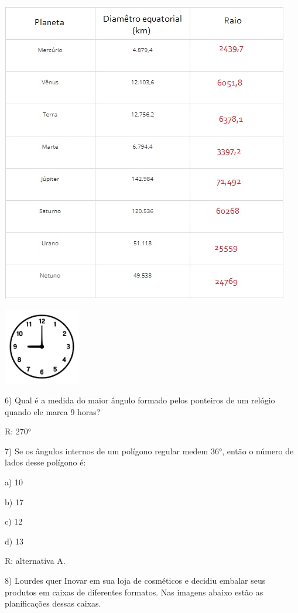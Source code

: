 \includegraphics[width=4.96875in,height=5.22917in]{./imgSAEB_6_MAT/media/image49.png}

\includegraphics[width=1.32083in,height=1.32083in]{./imgSAEB_6_MAT/media/image50.jpeg}

6) Qual é a medida do maior ângulo formado pelos ponteiros de um relógio
quando ele marca 9 horas?

R: 270°

7) Se os ângulos internos de um polígono regular medem 36°, então o
número de lados desse polígono é:

a) 10

b) 17

c) 12

d) 13

R: alternativa A.

8) Lourdes quer Inovar em sua loja de cosméticos e decidiu embalar seus
produtos em caixas de diferentes formatos. Nas imagens abaixo estão as
planificações dessas caixas.

